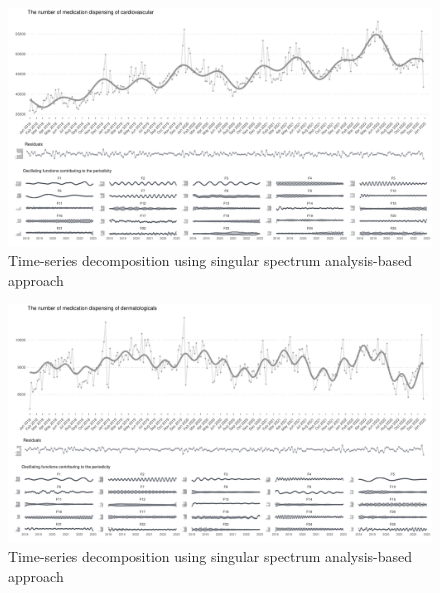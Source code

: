 \documentclass[
  letterpaper,
  DIV=11,
  numbers=noendperiod]{scrartcl}
\begin{document}
\begin{figure}[H]

{\centering \includegraphics[width=1\linewidth,height=\textheight,keepaspectratio]{supplementary_files/figure-pdf/unnamed-chunk-2-3.pdf}

}

\caption{Time-series decomposition using singular spectrum
analysis-based approach}

\end{figure}%

\begin{figure}[H]

{\centering \includegraphics[width=1\linewidth,height=\textheight,keepaspectratio]{supplementary_files/figure-pdf/unnamed-chunk-2-4.pdf}

}

\caption{Time-series decomposition using singular spectrum
analysis-based approach}

\end{figure}%
\end{document}
